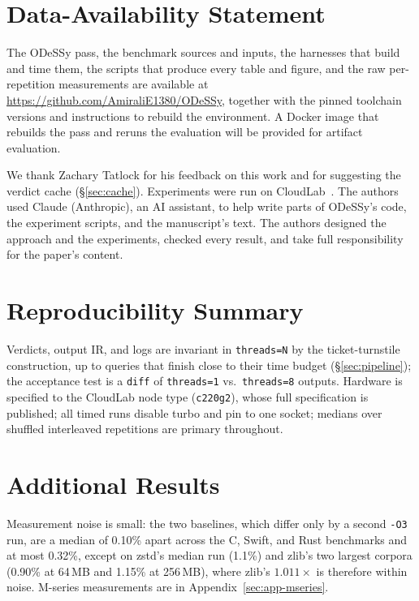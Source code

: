 \documentclass[acmsmall,screen,nonacm]{acmart}
\newcommand{\odessy}{ODeSSy}
\newcommand{\tool}{\odessy}
\begin{document}
\section*{Data-Availability Statement}
The \tool{} pass, the benchmark sources and inputs, the harnesses that
build and time them, the scripts that produce every table and figure, and
the raw per-repetition measurements are available at
\url{https://github.com/AmiraliE1380/ODeSSy}, together with the pinned
toolchain versions and instructions to rebuild the environment. A Docker
image that rebuilds the pass and reruns the evaluation will be provided for
artifact evaluation.
\begin{acks}
We thank Zachary Tatlock for his feedback on this work and for suggesting
the verdict cache (\S\ref{sec:cache}). Experiments were run on CloudLab~\cite{cloudlab}. The authors used Claude
(Anthropic), an AI assistant, to help write parts of \tool{}'s code, the
experiment scripts, and the manuscript's text. The authors designed the
approach and the experiments, checked every result, and take full
responsibility for the paper's content.
\end{acks}


\clearpage
\appendix
\section{Reproducibility Summary}
Verdicts, output IR, and logs are invariant in \texttt{threads=N} by the
ticket-turnstile construction, up to queries that finish close to their time budget (\S\ref{sec:pipeline}); the acceptance test is a
\texttt{diff} of \texttt{threads=1} vs.\ \texttt{threads=8} outputs.
Hardware is specified to the CloudLab node type (\texttt{c220g2}), whose
full specification is published; all timed runs disable turbo and pin to
one socket; medians over shuffled interleaved repetitions are primary
throughout. 

\section{Additional Results}
\label{sec:app-full}
Measurement noise is small: the two baselines, which differ only by a
second \texttt{-O3} run, are a median of 0.10\% apart across the C,
Swift, and Rust benchmarks and at most 0.32\%, except on zstd's median run
(1.1\%) and zlib's two largest corpora (0.90\% at 64\,MB and 1.15\% at 256\,MB), where zlib's
$1.011\times$ is therefore within noise.
M-series measurements are in Appendix~\ref{sec:app-mseries}.
\end{document}
